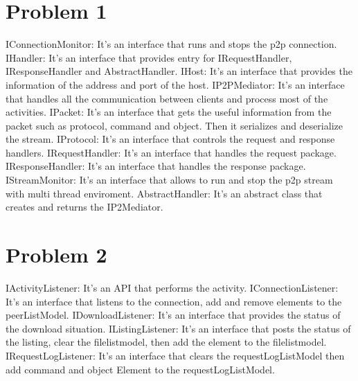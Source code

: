 \documentclass[12pt,letterpaper,boxed]{hmcpset}
\begin{document}
\section*{Problem 1}
IConnectionMonitor: It's an interface that runs and stops the p2p connection.\newline \newline 
IHandler: It's an interface that provides entry for IRequestHandler, IResponseHandler and AbstractHandler. \newline \newline
IHost: It's an interface that provides the information of the address and port of the host. \newline \newline
IP2PMediator: It's an interface that handles all the communication between clients and process most of the activities.\newline \newline
IPacket: It's an interface that gets the useful information from the packet such as protocol, command and object. Then it serializes and deserialize the stream. \newline \newline
IProtocol: It's an interface that controls the request and response handlers. \newline \newline
IRequestHandler: It's an interface that handles the request package. \newline \newline
IResponseHandler: It's an interface that handles the response package. \newline \newline
IStreamMonitor: It's an interface that allows to run and stop the p2p stream with multi thread enviroment. \newline \newline
AbstractHandler: It's an abstract class that creates and returns the IP2Mediator. 
\section*{Problem 2}
IActivityListener: It's an API that performs the activity. \newline \newline
IConnectionListener: It's an interface that listens to the connection, add and remove elements to the peerListModel. \newline \newline
IDownloadListener: It's an interface that provides the status of the download situation. \newline \newline
IListingListener: It's an interface that posts the status of the listing, clear the filelistmodel, then add the element to the filelistmodel. \newline \newline
IRequestLogListener: It's an interface that clears the requestLogListModel then add command and object Element to the requestLogListModel. \newline \newline
\end{document}
